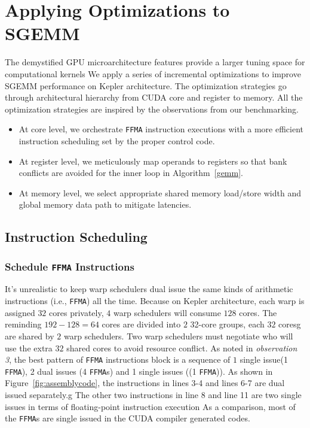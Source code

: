 \section{Applying Optimizations to SGEMM}
\label{sec:optimization}


The demystified GPU microarchitecture features provide a larger tuning space for computational kernels 
We apply
a series of incremental optimizations to improve SGEMM performance on Kepler architecture. The optimization strategies
go through architectural hierarchy from CUDA core and register to memory. All the optimization strategies are inspired by the observations from our benchmarking.
\begin{itemize}
\item At core level, we orchestrate {\tt FFMA} instruction executions with a more efficient instruction scheduling set by the proper control code.
\item At register level, we meticulously map operands to registers so that bank conflicts are avoided for the inner loop in Algorithm~\ref{gemm}.
\item At memory level, we select appropriate shared memory load/store width and global memory data path to mitigate
latencies.
\end{itemize}

\subsection{Instruction Scheduling}
\subsubsection{Schedule {\tt FFMA} Instructions}
It's unrealistic to keep warp schedulers dual issue the same kinds of arithmetic instructions (i.e., {\tt FFMA}) all
the time. Because on Kepler architecture, each warp is assigned $32$ cores privately, $4$ warp schedulers will consume
$128$ cores. The reminding $192-128=64$ cores are divided into $2$ 32-core groups, each $32$ coresg
are shared by $2$ warp schedulers. Two warp schedulers must negotiate who will use the extra $32$ shared cores to avoid
resource conflict.
As noted in {\em observation 3}, the best pattern of {\tt FFMA} instructions block is a sequence of $1$ single issue(1
{\tt FFMA}), 2 dual issues (4 {\tt FFMA}s) and 1 single issues ((1 {\tt FFMA})). As shown in
Figure~\ref{fig:assemblycode}, the instructions in lines 3-4 and lines 6-7 are dual issued separately.g
The other two instructions in line 8 and line 11 are two single issues in terms of floating-point instruction
execution
As a comparison, most of the {\tt FFMA}s are single issued in the CUDA compiler generated codes.

